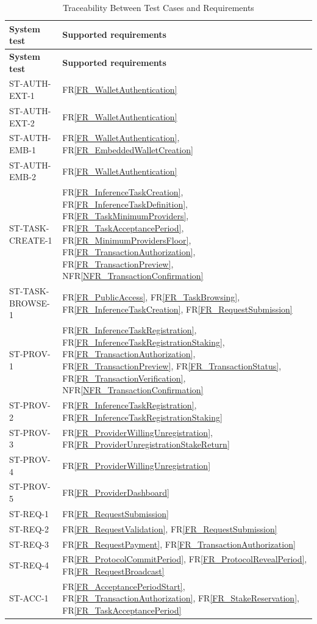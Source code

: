 \documentclass[12pt]{article}
\newcommand{\rref}[1]{FR\ref{#1}}
\newcommand{\nfrref}[1]{NFR\ref{#1}}
\begin{document}
\renewcommand{\arraystretch}{1.15}
\begin{longtable}{p{} p{}}
\caption{Traceability Between Test Cases and Requirements}\\
\toprule
\textbf{System test} & \textbf{Supported requirements}\\
\midrule
\endfirsthead
\toprule
\textbf{System test} & \textbf{Supported requirements}\\
\midrule
\endhead
ST-AUTH-EXT-1 & \rref{FR_WalletAuthentication}\\
ST-AUTH-EXT-2 & \rref{FR_WalletAuthentication}\\
ST-AUTH-EMB-1 & \rref{FR_WalletAuthentication}, \rref{FR_EmbeddedWalletCreation}\\
ST-AUTH-EMB-2 & \rref{FR_WalletAuthentication}\\
ST-TASK-CREATE-1 & \rref{FR_InferenceTaskCreation}, \rref{FR_InferenceTaskDefinition}, \rref{FR_TaskMinimumProviders}, \rref{FR_TaskAcceptancePeriod}, \rref{FR_MinimumProvidersFloor}, \rref{FR_TransactionAuthorization}, \rref{FR_TransactionPreview}, \nfrref{NFR_TransactionConfirmation}\\
ST-TASK-BROWSE-1 & \rref{FR_PublicAccess}, \rref{FR_TaskBrowsing}, \rref{FR_InferenceTaskCreation}, \rref{FR_RequestSubmission}\\
ST-PROV-1 & \rref{FR_InferenceTaskRegistration}, \rref{FR_InferenceTaskRegistrationStaking}, \rref{FR_TransactionAuthorization}, \rref{FR_TransactionPreview}, \rref{FR_TransactionStatus}, \rref{FR_TransactionVerification}, \nfrref{NFR_TransactionConfirmation}\\
ST-PROV-2 & \rref{FR_InferenceTaskRegistration}, \rref{FR_InferenceTaskRegistrationStaking}\\
ST-PROV-3 & \rref{FR_ProviderWillingUnregistration}, \rref{FR_ProviderUnregistrationStakeReturn}\\
ST-PROV-4 & \rref{FR_ProviderWillingUnregistration}\\
ST-PROV-5 & \rref{FR_ProviderDashboard}\\
ST-REQ-1 & \rref{FR_RequestSubmission}\\
ST-REQ-2 & \rref{FR_RequestValidation}, \rref{FR_RequestSubmission}\\
ST-REQ-3 & \rref{FR_RequestPayment}, \rref{FR_TransactionAuthorization}\\
ST-REQ-4 & \rref{FR_ProtocolCommitPeriod}, \rref{FR_ProtocolRevealPeriod}, \rref{FR_RequestBroadcast}\\
ST-ACC-1 & \rref{FR_AcceptancePeriodStart}, \rref{FR_TransactionAuthorization}, \rref{FR_StakeReservation}, \rref{FR_TaskAcceptancePeriod}\\

\end{longtable}
\end{document}
